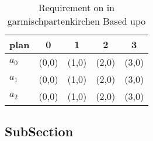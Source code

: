 \documentclass[a4paper]{article}
\begin{document}
\begin{table}
\begin{adjustbox}{width=0.6\columnwidth}
\begin{tabular}{|l|l|l|l|l|}
\hline
\textbf{plan} & \multicolumn{1}{c|}{\textbf{0}} & \multicolumn{1}{c|}{\textbf{1}} & \multicolumn{1}{c|}{\textbf{2}} & \multicolumn{1}{c|}{\textbf{3}} \\ \hline
\textbf{$a_0$}  & (0,0) & (1,0) & (2,0) & (3,0) \\ \hline
\textbf{$a_1$}  & (0,0) & (1,0) & (2,0) & (3,0) \\ \hline
\textbf{$a_2$}  & (0,0) & (1,0) & (2,0) & (3,0) \\ \hline
\end{tabular}
\end{adjustbox}
\caption{Requirement on in garmischpartenkirchen Based upo
}
\end{table}

\subsection{SubSection}
\end{document}
